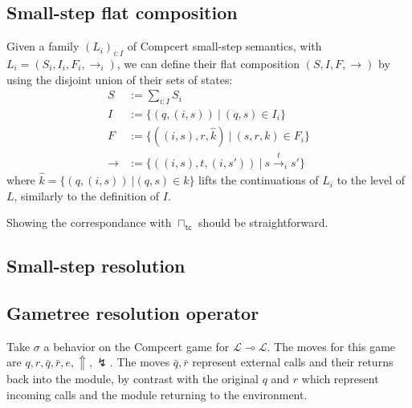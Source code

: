 \documentclass{article}
\newcommand{\kw}[1]{{\mathsf{#1}}}
\begin{document}
\subsection{Small-step flat composition}

Given a family $(L_i)_{i:I}$ of Compcert small-step semantics,
with $L_i = (S_i, I_i, F_i, {\rightarrow_i})$,
we can define their flat composition $(S, I, F, {\rightarrow})$
by using the disjoint union of their sets of states:
\begin{align*}
  S &:= \sum_{i:I} S_i \\
  I &:= \{ (q, (i, s)) \: \vert \: (q, s) \in I_i \} \\
  F &:= \{ ((i, s), r, \hat{k}) \: \vert \: (s, r, k) \in F_i \} \\
  {\rightarrow} &:= \{ ((i, s), t, (i, s')) \: \vert \: s
\stackrel{t}{\rightarrow}_i s' \}
\end{align*}
where $\hat{k} = \{ (q, (i, s)) \: \vert (q, s) \in k \}$
lifts the continuations of $L_i$ to the level of $L$,
similarly to the definition of $I$.

Showing the correspondance with $\sqcap_\kw{tc}$
should be straightforward.

\subsection{Small-step resolution}

%

\subsection{Gametree resolution operator}

Take $\sigma$ a behavior on the Compcert game for
$\mathcal{L} \multimap \mathcal{L}$.
The moves for this game are $q, r, \bar{q}, \bar{r}, e, \Uparrow, \lightning$.
The moves $\bar{q}, \bar{r}$ represent external calls and their returns
back into the module,
by contrast with the original $q$ and $r$ which represent
incoming calls and the module returning to the environment.
\end{document}
